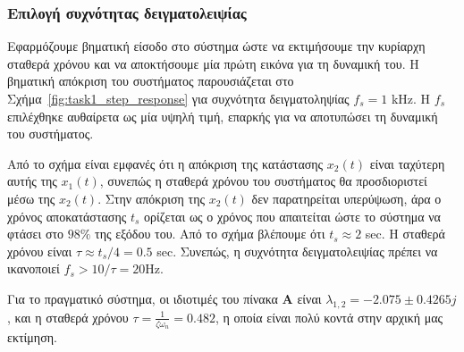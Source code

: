 \documentclass[a4paper,12pt]{article}
\begin{document}
\subsubsection*{Επιλογή συχνότητας δειγματολειψίας}

Εφαρμόζουμε βηματική είσοδο στο σύστημα ώστε να εκτιμήσουμε την κυρίαρχη σταθερά χρόνου  
και να αποκτήσουμε μία πρώτη εικόνα για τη δυναμική του. Η βηματική απόκριση του συστήματος  
παρουσιάζεται στο Σχήμα~\ref{fig:task1_step_response} για συχνότητα δειγματοληψίας $f_s = 1$
kHz. Η $f_s$ επιλέχθηκε αυθαίρετα ως μία υψηλή τιμή, 
επαρκής για να αποτυπώσει τη δυναμική του συστήματος.

Από το σχήμα είναι εμφανές ότι η απόκριση της κατάστασης $x_2(t)$ είναι ταχύτερη αυτής της $x_1(t)$,
συνεπώς η σταθερά χρόνου του συστήματος θα προσδιοριστεί μέσω της $x_2(t)$. Στην απόκριση της
$x_2(t)$ δεν παρατηρείται υπερύψωση, άρα ο χρόνος αποκατάστασης $t_s$ ορίζεται ως ο χρόνος που απαιτείται
ώστε το σύστημα να φτάσει στο $98\%$ της εξόδου του. Από το σχήμα βλέπουμε ότι $t_s \approx 2$
sec. Η σταθερά χρόνου είναι $\tau \approx t_s / 4 = 0.5$
sec. Συνεπώς, η συχνότητα δειγματολειψίας πρέπει να 
ικανοποιεί $f_s > 10 / \tau = 20$Hz.

Για το πραγματικό σύστημα, οι ιδιοτιμές του πίνακα $\mathbf{A}$ είναι $\lambda_{1,2} = -2.075 \pm 0.4265j$, 
και η σταθερά χρόνου $\tau = \frac{1}{\zeta \omega_n} = 0.482$, η οποία είναι πολύ κοντά στην αρχική 
μας εκτίμηση.
\end{document}
